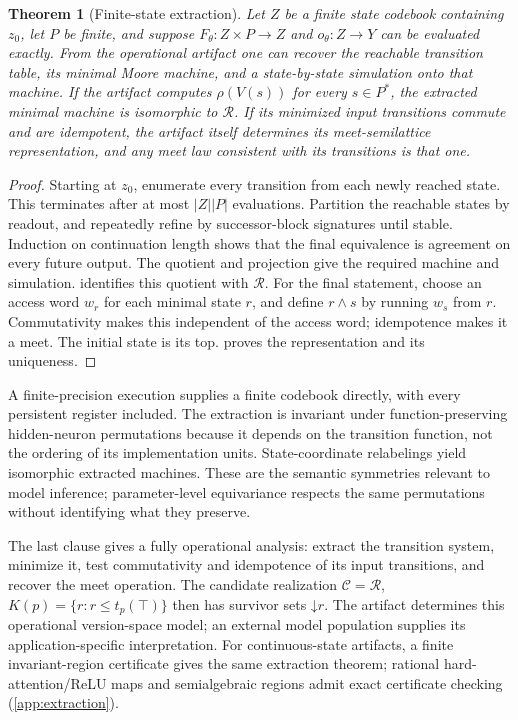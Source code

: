 \documentclass{article}
\newtheorem{theorem}{Theorem}
\theoremstyle{definition}
\newcommand{\C}{\mathcal C}
\newcommand{\R}{\mathcal R}
\begin{document}
\begin{theorem}[Finite-state extraction]\label{thm:extract}
Let $Z$ be a finite state codebook containing $z_0$, let $P$ be finite, and suppose $F_\theta:Z\times P\to Z$ and $o_\theta:Z\to Y$ can be evaluated exactly. From the operational artifact one can recover the reachable transition table, its minimal Moore machine, and a state-by-state simulation onto that machine. If the artifact computes $\rho(V(s))$ for every $s\in P^*$, the extracted minimal machine is isomorphic to $\R$. If its minimized input transitions commute and are idempotent, the artifact itself determines its meet-semilattice representation, and any meet law consistent with its transitions is that one.
\end{theorem}
\begin{proof}
Starting at $z_0$, enumerate every transition from each newly reached state. This terminates after at most $|Z||P|$ evaluations. Partition the reachable states by readout, and repeatedly refine by successor-block signatures until stable. Induction on continuation length shows that the final equivalence is agreement on every future output. The quotient and projection give the required machine and simulation.  identifies this quotient with $\R$. For the final statement, choose an access word $w_r$ for each minimal state $r$, and define $r\wedge s$ by running $w_s$ from $r$. Commutativity makes this independent of the access word; idempotence makes it a meet. The initial state is its top.  proves the representation and its uniqueness.
\end{proof}

A finite-precision execution supplies a finite codebook directly, with every persistent register included. The extraction is invariant under function-preserving hidden-neuron permutations because it depends on the transition function, not the ordering of its implementation units. State-coordinate relabelings yield isomorphic extracted machines. These are the semantic symmetries relevant to model inference; parameter-level equivariance \citep{zhou2023nfn,navon2023equivariant} respects the same permutations without identifying what they preserve.

The last clause gives a fully operational analysis: extract the transition system, minimize it, test commutativity and idempotence of its input transitions, and recover the meet operation. The candidate realization $\C=\R$, $K(p)=\{r:r\le t_p(\top)\}$ then has survivor sets $\mathord{\downarrow}r$. The artifact determines this operational version-space model; an external model population supplies its application-specific interpretation. For continuous-state artifacts, a finite invariant-region certificate gives the same extraction theorem; rational hard-attention/ReLU maps and semialgebraic regions admit exact certificate checking (\cref{app:extraction}).
\end{document}
